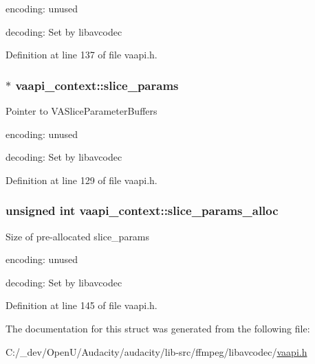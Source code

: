 \begin{DoxyItemize}
\item encoding\+: unused
\item decoding\+: Set by libavcodec 
\end{DoxyItemize}

Definition at line 137 of file vaapi.\+h.

\subsubsection[{\texorpdfstring{slice\+\_\+params}{slice_params}}]{$\ast$ vaapi\+\_\+context\+::slice\+\_\+params}\hypertarget{structvaapi__context_a0d9697f059f448fa6863787ce8f03bd5}{}\label{structvaapi__context_a0d9697f059f448fa6863787ce8f03bd5}
Pointer to V\+A\+Slice\+Parameter\+Buffers


\begin{DoxyItemize}
\item encoding\+: unused
\item decoding\+: Set by libavcodec 
\end{DoxyItemize}

Definition at line 129 of file vaapi.\+h.

\subsubsection[{\texorpdfstring{slice\+\_\+params\+\_\+alloc}{slice_params_alloc}}]{\setlength{\rightskip}{0pt plus 5cm}unsigned {\bf int} vaapi\+\_\+context\+::slice\+\_\+params\+\_\+alloc}\hypertarget{structvaapi__context_aeafe25a810ba11d4b81f12cd940d6313}{}\label{structvaapi__context_aeafe25a810ba11d4b81f12cd940d6313}
Size of pre-\/allocated slice\+\_\+params


\begin{DoxyItemize}
\item encoding\+: unused
\item decoding\+: Set by libavcodec 
\end{DoxyItemize}

Definition at line 145 of file vaapi.\+h.



The documentation for this struct was generated from the following file\+:\begin{DoxyCompactItemize}
\item 
C\+:/\+\_\+dev/\+Open\+U/\+Audacity/audacity/lib-\/src/ffmpeg/libavcodec/\hyperlink{vaapi_8h}{vaapi.\+h}\end{DoxyCompactItemize}
